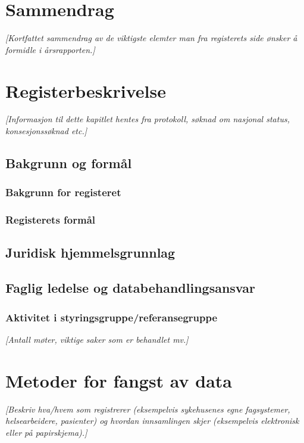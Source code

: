 \documentclass[norsk, a4paper, twocolumn]{report}
\newcommand{\guide}[1] {
	\textit{[\textcolor{guidegray}{#1}]}
	}
\begin{document}
\chapter{Sammendrag}
\guide{Kortfattet sammendrag av de viktigste elemter man fra registerets side ønsker å formidle i årsrapporten.}




\twocolumn




\chapter{Registerbeskrivelse}\label{cha:reg}
\guide{Informasjon til dette kapitlet hentes fra protokoll, søknad om nasjonal status, konsesjonssøknad etc.}


\section{Bakgrunn og formål}
\subsection{Bakgrunn for registeret}\label{sec:bak}
\subsection{Registerets formål}\label{sec:for}

\section{Juridisk hjemmelsgrunnlag}\label{cha:jur}

\section{Faglig ledelse og databehandlingsansvar}\label{cha:led}

\subsection{Aktivitet i styringsgruppe/referansegruppe}
\guide{Antall møter, viktige saker som er behandlet mv.}


\chapter{Metoder for fangst av data}
\guide{Beskriv hva/hvem som registrerer (eksempelvis sykehusenes egne
fagsystemer, helsearbeidere, pasienter) og hvordan innsamlingen skjer
(eksempelvis elektronisk eller på papirskjema).}
\end{document}
